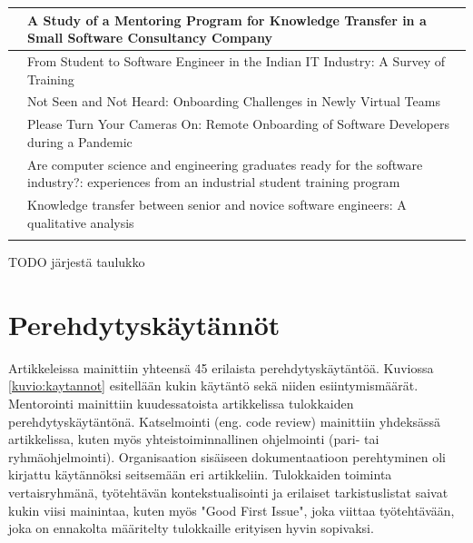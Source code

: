 \documentclass[utf8]{gradu3}
\begin{document}
\begin{table}
\begin{tabular}{p{3.5cm}p{12cm}}
        \midrule
        \textcite{bjornson-dingsøyr-2005} & A Study of a Mentoring Program for Knowledge Transfer in a Small Software Consultancy Company \\
        \midrule
        \textcite{kulkarni-ym-2010} & From Student to Software Engineer in the Indian IT Industry: A Survey of Training \\
        \midrule
        \textcite{hemphill-begel-2011} & Not Seen and Not Heard: Onboarding Challenges in Newly Virtual Teams \\
        \midrule
        \textcite{rodeghero-ym-2021} & Please Turn Your Cameras On: Remote Onboarding of Software Developers during a Pandemic \\
        \midrule
        \textcite{tuzun-ym-2018} & Are computer science and engineering graduates ready for the software industry?: experiences from an industrial student training program \\
        \midrule
        \textcite{viana-ym-2014} & Knowledge transfer between senior and novice software engineers: A qualitative analysis \\
        \bottomrule
\label{tbl:artikkelit}
\end{tabular}
\end{table}

TODO järjestä taulukko




\section{Perehdytyskäytännöt}

Artikkeleissa mainittiin yhteensä 45 erilaista perehdytyskäytäntöä. Kuviossa \ref{kuvio:kaytannot} esitellään kukin käytäntö sekä niiden esiintymismäärät. Mentorointi mainittiin kuudessatoista artikkelissa tulokkaiden perehdytyskäytäntönä. Katselmointi (eng. code review) mainittiin yhdeksässä artikkelissa, kuten myös yhteistoiminnallinen ohjelmointi (pari- tai ryhmäohjelmointi). Organisaation sisäiseen dokumentaatioon perehtyminen oli kirjattu käytännöksi seitsemään eri artikkeliin. Tulokkaiden toiminta vertaisryhmänä, työtehtävän kontekstualisointi ja erilaiset tarkistuslistat saivat kukin viisi mainintaa, kuten myös "Good First Issue", joka viittaa työtehtävään, joka on ennakolta määritelty tulokkaille erityisen hyvin sopivaksi.
\end{document}
